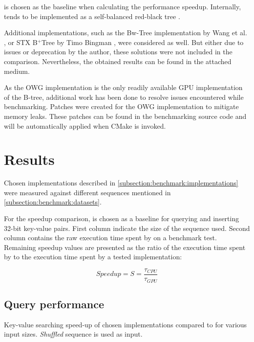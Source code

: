  is chosen as the baseline when calculating the performance speedup. Internally,  tends to be implemented as a self-balanced red-black tree \cite{cppreference-map}.

Additional implementations, such as the Bw-Tree \cite{bw-tree} implementation by Wang et al. \cite{bwtree-impl}, or STX B$^+$Tree by Timo Bingman \cite{stx-b+tree}, were considered as well. But either due to issues or deprecation by the author, these solutions were not included in the comparison. Nevertheless, the obtained results can be found in the attached medium.

As the OWG implementation is the only readily available GPU implementation of the B-tree, additional work has been done to resolve issues encountered while benchmarking. Patches were created for the OWG implementation to mitigate memory leaks. These patches can be found in the benchmarking source code and will be automatically applied when CMake is invoked.

\section{Results}\label{section:results}

Chosen implementations described in \cref{subsection:benchmark:implementations} were measured against different sequences mentioned in \cref{subsection:benchmark:datasets}.

For the speedup comparison,  is chosen as a baseline for querying and inserting 32-bit key-value pairs. First column indicate the size of the sequence used. Second column contains the raw execution time spent by  on a benchmark test. Remaining speedup values are presented as the ratio of the execution time spent by  to the execution time spent by a tested implementation:

$$\mathit{Speedup} = S = \frac{\tau_{\mathit{CPU}}}{\tau_{\mathit{GPU}}}$$

\subsection{Query performance}
\begin{table}
  \centering
  
  \caption{Key-value searching speed-up of chosen implementations compared to  for various input sizes. \textit{Shuffled} sequence is used as input.}
  \label{table:query-shuffle}
\end{table}

